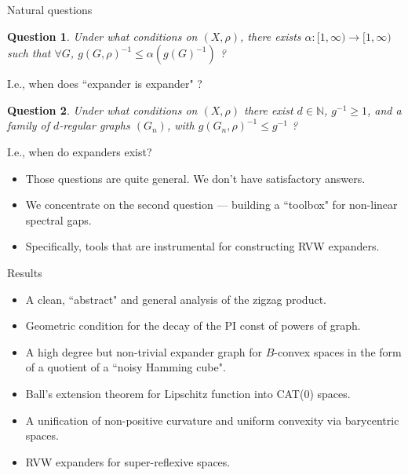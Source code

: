 \documentclass[compress]{beamer}
\newtheorem{question}{Question}
\begin{document}
\begin{frame}{Natural questions}

\onslide<+->
\begin{question}
Under what conditions on $(X,\rho)$, there exists $\alpha:[1,\infty)\to [1,\infty)$ such that
$\forall G$,  $g(G,\rho)^{-1} \le \alpha(g(G)^{-1})$ ?
\end{question}

I.e., when does ``expander is expander" ?

\onslide<+-> 
\begin{question}
Under what conditions on $(X,\rho)$ there exist $d\in \mathbb N$,  $g^{-1}\ge 1$, and a family of $d$-regular graphs
$(G_n)$, with $g(G_n,\rho)^{-1}\le g^{-1}$ ?
\end{question} 

I.e., when do expanders exist?

\medskip

\begin{itemize}[<+->]
\item Those questions are quite general. We don't have satisfactory answers.

\item We concentrate on the second question --- building a ``toolbox" for non-linear spectral gaps.

\item Specifically, tools that are instrumental for constructing RVW expanders. 
\end{itemize}
\end{frame}

\begin{frame}{Results}

\begin{itemize}[<+->]
\item A clean, ``abstract" and general analysis of the zigzag product.
\item Geometric condition for the decay of the PI const of powers of graph.
\item A high degree but non-trivial expander graph for $B$-convex spaces in the form of a quotient of a ``noisy Hamming cube".
\item Ball's extension theorem for Lipschitz function into CAT(0) spaces.
\item A unification of non-positive curvature  and uniform convexity via barycentric spaces.
\item RVW expanders for super-reflexive spaces.
\end{itemize}

%
%

\end{frame}
\end{document}
